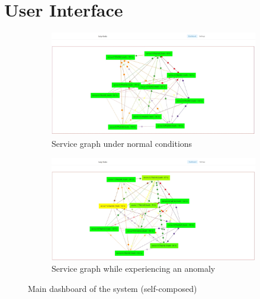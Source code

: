 {\let\clearpage\relax\chapter{User Interface}}\label{appendix:ui}

\begin{figure}[H]
    \centering
    \begin{subfigure}[b]{1\textwidth}
        \centering
        \includegraphics[width=\textwidth]{assets/appendix/before-anomly.png}
        \caption{Service graph under normal conditions}
    \end{subfigure}
    \hfill
    \begin{subfigure}[b]{1\textwidth}
        \centering
        \includegraphics[width=\textwidth]{assets/appendix/after-anomly.png}
        \caption{Service graph while experiencing an anomaly}
    \end{subfigure}
    \hfill
    \caption{Main dashboard of the system (self-composed)}
\end{figure}